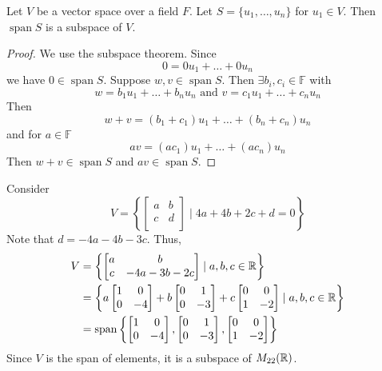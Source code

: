 \documentclass{article}
\DeclareMathOperator{\spn}{span}
\newcommand{\F}{\mathbb{F}}
\begin{document}
\begin{theorem}
  Let $V$ be a vector space over a field $F$. Let $S = \{u_1, \ldots, u_n\}$ for $u_1 \in V$. Then $\spn S$ is a subspace of $V$.
\end{theorem}
\begin{proof}
  We use the subspace theorem. Since
  \[
    0 = 0u_1 + \dots + 0u_n
  \]
  we have $0 \in \spn S$. Suppose $w, v \in \spn S$. Then $\exists b_i, c_i \in \F$ with \[
    w = b_1u_1 + \dots + b_nu_n \text{ and } v = c_1u_1 + \dots + c_nu_n
  \]
  Then \[
    w+v = (b_1+c_1)u_1 + \dots + (b_n + c_n)u_n
  \]
  and for $a \in \F$
  \[
    av = (ac_1)u_1 + \dots + (ac_n)u_n
  \]
  Then $w+v \in \spn S$ and $av \in \spn S$.
\end{proof}
\begin{example}
  Consider \[
    V = \left\{
      \begin{bmatrix}
        a & b\\
        c & d\\
      \end{bmatrix} \mid 4a + 4b + 2c + d = 0
    \right\}
  \]
  Note that $d = -4a - 4b - 3c$.
  Thus,
  \begin{align*}
    V &= \left\{
      \begin{bmatrix}
        a & b\\
        c & -4a - 3b -2c\\
    \end{bmatrix} \mid a, b, c \in \R \right\}\\
    &= \left\{
      a
      \begin{bmatrix}
        1 & 0\\
        0 & -4\\
      \end{bmatrix}
      +    b
      \begin{bmatrix}
        0 & 1\\
        0 & -3\\
      \end{bmatrix}
      + c
      \begin{bmatrix}
        0 & 0\\
        1 & -2\\
      \end{bmatrix}
      \mid a, b, c \in \R
    \right\}\\
    &= \spn \left\{
      \begin{bmatrix}
        1 & 0\\
        0 & -4\\
      \end{bmatrix}
      ,
      \begin{bmatrix}
        0 & 1\\
        0 & -3\\
      \end{bmatrix}
      ,
      \begin{bmatrix}
        0 & 0\\
        1 & -2\\
    \end{bmatrix}\right\}
  \end{align*}
  Since $V$ is the span of elements, it is a subspace of $M_{22}(\mathbb{R})$.
\end{example}
\end{document}
